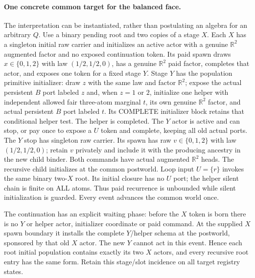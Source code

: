 \documentclass[11pt]{article}
\begin{document}
\paragraph{One concrete common target for the balanced face.}
The interpretation can be instantiated, rather than postulating an algebra for an arbitrary $Q$. Use a binary pending root and two copies of a stage $X$. Each $X$ has a singleton initial raw carrier and initializes an active actor with a genuine $\mathbb R^2$ augmented factor and no exposed continuation token. Its paid spawn draws $x\in\{0,1,2\}$ with law $(1/2,1/2,0)$, has a genuine $\mathbb R^2$ paid factor, completes that actor, and exposes one token for a fixed stage $Y$. Stage $Y$ has the population primitive initializer: draw $z$ with the same law and factor $\mathbb R^2$; expose the actual persistent $B$ port labeled $z$ and, when $z=1$ or $2$, initialize one helper with independent allowed fair three-atom marginal $t$, its own genuine $\mathbb R^2$ factor, and actual persistent $B$ port labeled $t$. Its COMPLETE initializer block retains that conditional helper test. The helper is completed. The $Y$ actor is active and can stop, or pay once to expose a $U$ token and complete, keeping all old actual ports. The $Y$ stop has singleton raw carrier. Its spawn has raw $v\in\{0,1,2\}$ with law $(1/2,1/2,0)$; retain $v$ privately and include it with the producing ancestry in the new child binder. Both commands have actual augmented $\mathbb R^2$ heads. The recursive child initializes at the common postworld. Loop input $U=\{r\}$ invokes the same binary two-$X$ root. Its initial closure has no $U$ port; the helper silent chain is finite on ALL atoms. Thus paid recurrence is unbounded while silent initialization is guarded. Every event advances the common world once.

The continuation has an explicit waiting phase: before the $X$ token is born there is no $Y$ or helper actor, initializer coordinate or paid command. At the supplied $X$ spawn boundary it installs the complete $Y$/helper schema at the postworld, sponsored by that old $X$ actor. The new $Y$ cannot act in this event. Hence each root initial population contains exactly its two $X$ actors, and every recursive root entry has the same form. Retain this stage/slot incidence on all target registry states.
\end{document}
